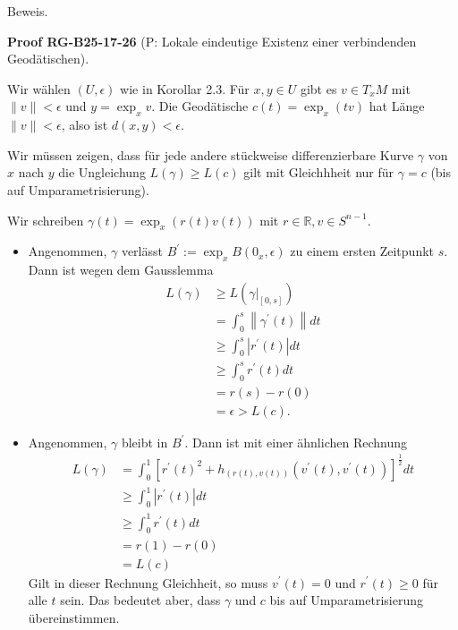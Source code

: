 \documentclass[10pt, letterpaper]{article}
\newcommand{\CustomHeading}[3]{%
  \par\medskip\noindent%
  \textbf{#1 #2} \textnormal{(#3)}.\enskip%
}
\newenvironment{PROOF}[2]{\begin{unitbox}\CustomHeading{Proof}{#1}{#2}}{\end{unitbox}}
\begin{document}
Beweis. 

\begin{PROOF}{RG-B25-17-26}{P: Lokale eindeutige Existenz einer verbindenden Geodätischen}
Wir wählen $(U, \epsilon)$ wie in Korollar 2.3. Für $x, y \in U$ gibt es $v \in T_{x} M$ mit $\|v\|<\epsilon$ und $y=\exp _{x} v$. Die Geodätische $c(t)=\exp _{x}(t v)$ hat Länge $\|v\|<\epsilon$, also ist $d(x, y)<\epsilon$.

Wir müssen zeigen, dass für jede andere stückweise differenzierbare Kurve $\gamma$ von $x$ nach $y$ die Ungleichung $L(\gamma) \geq L(c)$ gilt mit Gleichhheit nur für $\gamma=c$ (bis auf Umparametrisierung).

Wir schreiben $\gamma(t)=\exp _{x}(r(t) v(t))$ mit $r \in \mathbb{R}, v \in S^{n-1}$.
\begin{itemize}
  \item Angenommen, $\gamma$ verlässt $B^{\prime}:=\exp _{x} B\left(0_{x}, \epsilon\right)$ zu einem ersten Zeitpunkt $s$. Dann ist wegen dem Gausslemma
$$
\begin{aligned}
L(\gamma) & \geq L\left(\left.\gamma\right|_{[0, s]}\right) \\
& =\int_{0}^{s}\left\|\gamma^{\prime}(t)\right\| d t \\
& \geq \int_{0}^{s}\left|r^{\prime}(t)\right| d t \\
& \geq \int_{0}^{s} r^{\prime}(t) d t \\
& =r(s)-r(0) \\
& =\epsilon>L(c) .
\end{aligned}
$$

  \item Angenommen, $\gamma$ bleibt in $B^{\prime}$. Dann ist mit einer ähnlichen Rechnung
$$
\begin{aligned}
L(\gamma) & =\int_{0}^{1}\left[r^{\prime}(t)^{2}+h_{(r(t), v(t))}\left(v^{\prime}(t), v^{\prime}(t)\right)\right]^{\frac{1}{2}} d t \\
& \geq \int_{0}^{1}\left|r^{\prime}(t)\right| d t \\
& \geq \int_{0}^{1} r^{\prime}(t) d t \\
& =r(1)-r(0) \\
& =L(c)
\end{aligned}
$$
Gilt in dieser Rechnung Gleichheit, so muss $v^{\prime}(t)=0$ und $r^{\prime}(t) \geq 0$ für alle $t$ sein. Das bedeutet aber, dass $\gamma$ und $c$ bis auf Umparametrisierung übereinstimmen.
\end{itemize}
\end{PROOF}
\end{document}
